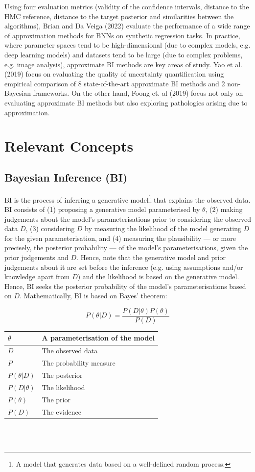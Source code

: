 \documentclass[conference]{IEEEtran}
\begin{document}
Using four evaluation metrics (validity of the confidence intervals, distance to the HMC reference, distance to the target posterior and similarities between the algorithms), Brian and Da Veiga (2022) evaluate the performance of a wide range of approximation methods for BNNs on synthetic regression tasks. In practice, where parameter spaces tend to be high-dimensional (due to complex models, e.g. deep learning models) and datasets tend to be large (due to complex problems, e.g. image analysis), approximate BI methods are key areas of study. Yao et al. (2019) focus on evaluating the quality of uncertainty quantification using empirical comparison of 8 state-of-the-art approximate BI methods and 2 non-Bayesian frameworks. On the other hand, Foong et. al (2019) focus not only on evaluating approximate BI methods but also exploring pathologies arising due to approximation.

\section{Relevant Concepts}
\subsection{Bayesian Inference (BI)}
BI is the process of inferring a generative model\footnote{A model that generates data based on a well-defined random process.} that explains the observed data. BI consists of (1) proposing a generative model parameterised by $\theta$, (2) making judgements about the model's parameterisations prior to considering the observed data $D$, (3) considering $D$ by measuring the likelihood of the model generating $D$ for the given parameterisation, and (4) measuring the plausibility — or more precisely, the posterior probability — of the model's parameterisations, given the prior judgements and $D$. Hence, note that the generative model and prior judgements about it are set before the inference (e.g. using assumptions and/or knowledge apart from $D$) and the likelihood is based on the generative model. Hence, BI seeks the posterior probability of the model's parameterisations based on $D$. Mathematically, BI is based on Bayes' theorem:

\begin{equation*}
    P(\theta|D) = \frac{P(D|\theta)P(\theta)}{P(D)}
\end{equation*}

\begin{tabular}{| m{1.5cm} | m{6cm} |}
    \hline
    $\theta$ & A parameterisation of the model\\
    \hline
    $D$ & The observed data\\
    \hline
    $P$ & The probability measure\\
    \hline
    $P(\theta|D)$ & The posterior\\
    \hline
    $P(D|\theta)$ & The likelihood\\
    \hline
    $P(\theta)$ & The prior\\
    \hline
    $P(D)$ & The evidence\\
    \hline
\end{tabular}\\~\\
\end{document}
